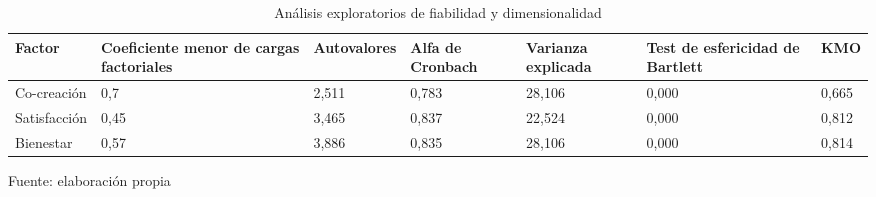 \begin{table}[h]
    \caption {Análisis exploratorios de fiabilidad y dimensionalidad}
	\label{tab:afe}
	\setlength\extrarowheight{5pt}
	
	\begin{tabular}{p{1.9cm} p{1.9cm} p{1.9cm} p{1.9cm} p{1.9cm} p{1.9cm} p{1.7cm}}
	\toprule
	Factor	& Coeficiente menor de cargas factoriales	& Autovalores & Alfa de Cronbach & Varianza explicada & Test de esfericidad de Bartlett & KMO \\
	\midrule
	Co-creación	 & 0,7	& 2,511	& 0,783	& 28,106 & 0,000 & 0,665 \\
	Satisfacción & 0,45	& 3,465	& 0,837	& 22,524 & 0,000 & 0,812 \\
	Bienestar	 & 0,57	& 3,886	& 0,835	& 28,106 & 0,000 & 0,814 \\
	\bottomrule
	\end{tabular}
	
	\center
	\footnotesize
	Fuente: elaboración propia
\end{table}
